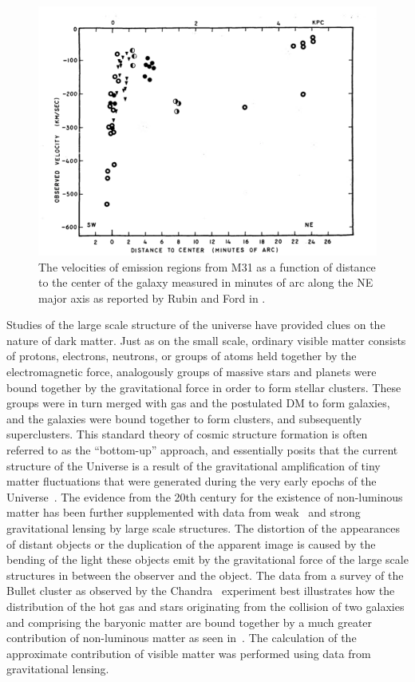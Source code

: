 \begin{figure}
  \centering
  \includegraphics[width=\textwidth]{figs/RubinFordVel}
  \caption{The velocities of emission regions from M31 as a function of distance to the center of the galaxy measured in minutes of arc along the NE major axis as reported by Rubin and Ford in \cite{Rubin:1970zza}.}
\label{fig:rubin}
\end{figure}

Studies of the large scale structure of the universe have provided clues on the nature of dark matter. Just as on the small scale, ordinary visible matter consists of protons, electrons, neutrons, or groups of atoms held together by the electromagnetic force, analogously groups of massive stars and planets were bound together by the gravitational force in order to form stellar clusters. These groups were in turn merged with gas and the postulated DM to form galaxies, and the galaxies were bound together to form clusters, and subsequently superclusters. This standard theory of cosmic structure formation is often referred to as the ``bottom-up'' approach, and essentially posits that the current structure of the Universe is a result of the gravitational amplification of tiny matter fluctuations that were generated during the very early epochs of the Universe~\cite{Allen:2002eu}. The evidence from the 20th century for the existence of non-luminous matter has been further supplemented with data from weak~\cite{Refregier:2003ct} and strong~\cite{Tyson:1998vp} gravitational lensing by large scale structures. The distortion of the appearances of distant objects or the duplication of the apparent image is caused by the bending of the light these objects emit by the gravitational force of the large scale structures in between the observer and the object. The data from a survey of the Bullet cluster as observed by the Chandra~\cite{Markevitch:2005vi} experiment best illustrates how the distribution of the hot gas and stars originating from the collision of two galaxies and comprising the baryonic matter are bound together by a much greater contribution of non-luminous matter as seen in~. The calculation of the approximate contribution of visible matter was performed using data from gravitational lensing.

